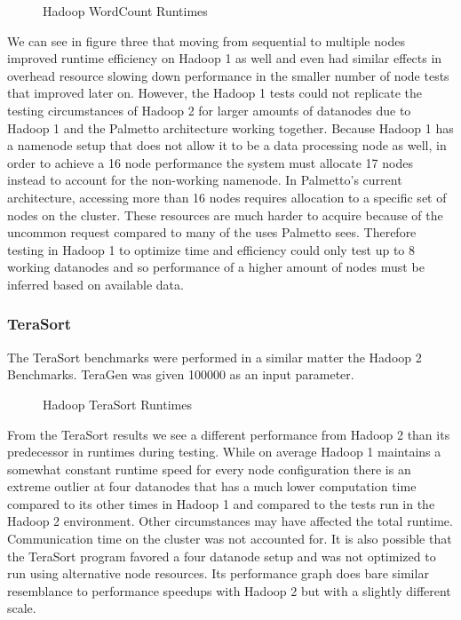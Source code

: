 \documentclass[conference]{IEEEtran}
\begin{document}
						\begin{figure}[h]
                   					\begin{center}
                       						
                        						\caption{Hadoop WordCount Runtimes}
                    				\end{center}
                  			\end{figure}

					We can see in figure three that moving from sequential to multiple nodes improved runtime efficiency on Hadoop 1 as well and even had similar effects in overhead resource slowing down performance in the smaller number of node tests that improved later on. However, the Hadoop 1 tests could not replicate the testing circumstances of Hadoop 2 for larger amounts of datanodes due to Hadoop 1 and the Palmetto architecture working together. Because Hadoop 1 has a namenode setup that does not allow it to be a data processing node as well, in order to achieve a 16 node performance the system must allocate 17 nodes instead to account for the non-working namenode. In Palmetto’s current architecture, accessing more than 16 nodes requires allocation to a specific set of nodes on the cluster. These resources are much harder to acquire because of the uncommon request compared to many of the uses Palmetto sees. Therefore testing in Hadoop 1 to optimize time and efficiency could only test up to 8 working datanodes and so performance of a higher amount of nodes must be inferred based on
available data.
					\subsubsection{TeraSort}
						The TeraSort benchmarks were performed in a similar matter the Hadoop 2 Benchmarks. TeraGen was given 100000 as an input parameter.
						\begin{figure}[h]
                   					\begin{center}
                       						
                        						\caption{Hadoop TeraSort Runtimes}
                    				\end{center}
                  			\end{figure}
					
					From the TeraSort results we see a different performance from Hadoop 2 than its predecessor in runtimes during testing. While on average Hadoop 1 maintains a somewhat constant runtime speed for every node configuration there is an extreme outlier at four datanodes that has a much lower computation time compared to its other times in Hadoop 1 and compared to the tests run in the Hadoop 2 environment. Other circumstances may have affected the total runtime. Communication time on the cluster was not accounted for.  It is also possible that the TeraSort program favored a four datanode setup and was not optimized to run using alternative node resources. Its performance graph does bare similar resemblance to performance speedups with Hadoop 2 but with a slightly different scale.
\end{document}
